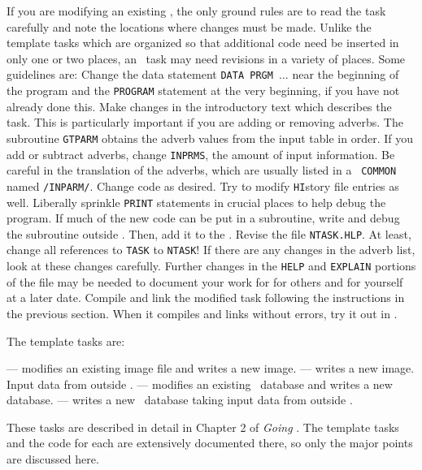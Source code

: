      If you are modifying an existing , the only ground
rules are to read the task carefully and note the locations where
changes must be made.  Unlike the template tasks which are organized
so that additional code need be inserted in only one or two places, an
\AIPS\ task may need revisions in a variety of places.  Some
guidelines are:
\xben
\Item Change the data statement {\tt DATA PRGM $\ldots$} near
    the beginning of the program and the {\tt PROGRAM} statement at
    the very beginning, if you have not already done this.
\Item Make changes in the introductory text which describes the
    task.  This is particularly important if you are adding or
    removing adverbs.
\Item The subroutine {\tt GTPARM} obtains the adverb values from
    the input table in order.  If you add or subtract adverbs, change
    {\tt INPRMS}, the amount of input information.  Be careful in the
    translation of the adverbs, which are usually listed in a {\tt
    COMMON} named {\tt /INPARM/}.
\Item Change code as desired.  Try to modify {\tt HI}story file
    entries as well.
\Item Liberally sprinkle {\tt PRINT} statements in crucial places
    to help debug the program.  If much of the new code can be put in
    a subroutine, write and debug the subroutine outside \hbox{\AIPS}.
    Then, add it to the .
\Item Revise the file \hbox{{\tt NTASK.HLP}}.  At least, change
    all references to {\tt TASK} to {\tt NTASK}!  If there are any
    changes in the adverb list, look at these changes carefully.
    Further changes in the {\tt HELP} and {\tt EXPLAIN} portions of
    the file may be needed to document your work for for others and
    for yourself at a later date.
\Item Compile and link the modified task following the
    instructions in the previous section.  When it compiles and links
    without errors, try it out in \hbox{\AIPS}.
\xeen


     The template tasks are:

\xben
{} --- modifies an existing image file and
    writes a new image.
 --- writes a new image.  Input data from
    outside \hbox{\AIPS}.
 --- modifies an existing \uv\ database and
    writes a new database.
 --- writes a new \uv\ database taking input data
    from outside \hbox{\AIPS}.
\xeen

     These tasks are described in detail in Chapter 2 of {\it Going\/}
\hbox{\AIPS}. The template tasks and the code for each are extensively
documented there, so only the major points are discussed here.

